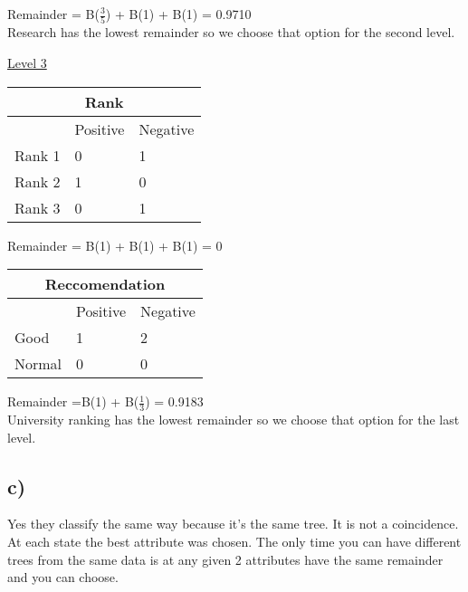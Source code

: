 Remainder = B($\frac{3}{5}$) +  B(1) + B(1) = 0.9710\\

Research has the lowest remainder so we choose that option for the second level.

\underline{Level 3}

\begin{tabular}{ |p{3cm}||p{3cm}|p{3cm}| }
 \hline
 \multicolumn{3}{|c|}{Rank} \\
 \hline
 & Positive & Negative\\
 \hline
 Rank 1 & 0 & 1\\
 Rank 2 &   1 & 0\\
 Rank 3 &   0 & 1\\
 \hline
\end{tabular}

Remainder = B(1) +  B(1) + B(1) = 0\\

\begin{tabular}{ |p{3cm}||p{3cm}|p{3cm}| }
 \hline
 \multicolumn{3}{|c|}{Reccomendation} \\
 \hline
 & Positive & Negative\\
 \hline
 Good & 1 & 2\\
 Normal &   0 & 0\\
 \hline
\end{tabular}

Remainder =B(1) + B($\frac{1}{3}$) = 0.9183\\

University ranking has the lowest remainder so we choose that option for the last level.

\subsection*{c)}
Yes they classify the same way because it's the same tree. It is not a coincidence. At each state the best attribute was chosen. The only time you can have different trees from the same data is at any given 2 attributes have the same remainder and you can choose.